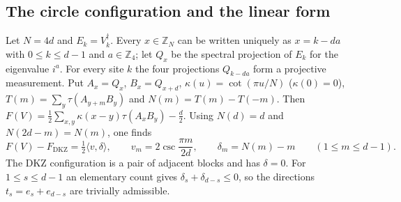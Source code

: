 \documentclass[11pt]{article}
\newcommand{\Z}{\mathbb{Z}}
\newcommand{\FD}{F_{\mathrm{DKZ}}}
\begin{document}
\subsection*{The circle configuration and the linear form}
Let $N=4d$ and $E_k=V_k^\dagger$. Every $x\in\Z_N$ can be written uniquely as $x=k-da$ with $0\le k\le d-1$ and
$a\in\Z_4$; let $Q_x$ be the spectral projection of $E_k$ for the eigenvalue $i^a$. For every site $k$ the four
projections $Q_{k-da}$ form a projective measurement. Put $A_x=Q_x$, $B_x=Q_{x+d}$, $\kappa(u)=\cot(\pi u/N)$
($\kappa(0)=0$), $T(m)=\sum_y\tau(A_{y+m}B_y)$ and $N(m)=T(m)-T(-m)$. Then $F(V)=\frac12\sum_{x,y}\kappa(x-y)\tau(A_xB_y)
-\frac d2$. Using $N(d)=d$ and $N(2d-m)=N(m)$, one finds
\begin{equation}\label{eq:linear}
F(V)-\FD=\tfrac12\langle v,\delta\rangle,\qquad v_m=2\csc\frac{\pi m}{2d},\qquad\delta_m=N(m)-m\qquad(1\le m\le d-1).
\end{equation}
The DKZ configuration is a pair of adjacent blocks and has $\delta=0$. For $1\le s\le d-1$ an elementary count gives
$\delta_s+\delta_{d-s}\le0$, so the directions $t_s=e_s+e_{d-s}$ are trivially admissible.
\end{document}
